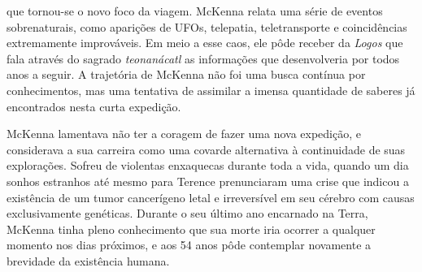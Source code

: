 que tornou-se o novo foco da viagem.  McKenna relata uma série de 
eventos sobrenaturais, como aparições de UFOs, telepatia, teletransporte 
e coincidências extremamente improváveis. Em meio a esse caos, ele pôde 
receber da \emph{Logos} que fala através do sagrado \emph{teonanácatl} 
as informações que desenvolveria por todos anos a seguir. A trajetória 
de McKenna não foi uma busca contínua por conhecimentos, mas uma 
tentativa de assimilar a imensa quantidade de saberes já encontrados 
nesta curta expedição.\\
\par
McKenna lamentava não ter a coragem de fazer uma nova expedição, e 
considerava a sua carreira como uma covarde alternativa à continuidade 
de suas explorações.  Sofreu de violentas enxaquecas durante toda a 
vida, quando um dia sonhos estranhos até mesmo para Terence prenunciaram 
uma crise que indicou a existência de um tumor cancerígeno letal e 
irreversível em seu cérebro com causas exclusivamente genéticas. Durante 
o seu último ano encarnado na Terra, McKenna tinha pleno conhecimento 
que sua morte iria ocorrer a qualquer momento nos dias próximos, e aos 
54 anos pôde contemplar novamente a brevidade da existência humana.\\

%
%
%
